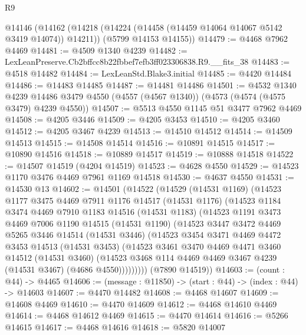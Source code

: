 \begin{lexlean}{R9}
\begin{coremodule}
  @14146
    (@14162
      (@14218 (@14224 (@14458 (@14459 @14064 @14067 @5142 @3419 @14074)) @14211))
      (@5799 @14153 @14155))
@14479 := @4468 @7962 @4469
@14481 := @4509 @1340 @4239
@14482 := LexLeanPreserve.Cb2bffcc8b22fbbef7efb3ff023306838.R9.__fits_38
@14483 := @4518 @14482
@14484 := LexLeanStd.Blake3.initial
@14485 := @4420 @14484
@14486 := @14483 @14485
@14487 := @14481 @14486
@14501 := @4532
    @1340
    @4239
    @14486
    @3479
    @4550
    (@4557 (@4567 @1340))
    (@4573 (@4574 (@4575 @3479) @4239 @4550))
@14507 := @5513 @4550 @1145 @51 @3477 @7962 @4469
@14508 := @4205 @3446
@14509 := @4205 @3453
@14510 := @4205 @3460
@14512 := @4205 @3467 @4239
@14513 := @14510 @14512
@14514 := @14509 @14513
@14515 := @14508 @14514
@14516 := @10891 @14515
@14517 := @10890 @14516
@14518 := @10889 @14517
@14519 := @10888 @14518
@14522 := @14507 @14519 (@4204 @14519)
@14523 := @4628 @4550
@14529 := @14523 @1170 @3476 @4469 @7961 @1169 @14518
@14530 := @4637 @4550
@14531 := @14530 @13
@14602 := @14501
    (@14522
      (@14529
        (@14531 @1169)
        (@14523
          @1177
          @3475
          @4469
          @7911
          @1176
          @14517
          (@14531 @1176)
          (@14523
            @1184
            @3474
            @4469
            @7910
            @1183
            @14516
            (@14531 @1183)
            (@14523
              @1191
              @3473
              @4469
              @7006
              @1190
              @14515
              (@14531 @1190)
              (@14523
                @3447
                @3472
                @4469
                @5265
                @3446
                @14514
                (@14531 @3446)
                (@14523
                  @3454
                  @3471
                  @4469
                  @4472
                  @3453
                  @14513
                  (@14531 @3453)
                  (@14523
                    @3461
                    @3470
                    @4469
                    @4471
                    @3460
                    @14512
                    (@14531 @3460)
                    (@14523 @3468 @114 @4469 @4469 @3467 @4239 (@14531 @3467) (@4686 @4550)))))))))
      (@7890 @14519))
@14603 := (count : @44) -> @4465
@14606 := (message : @11850) -> (start : @44) -> (index : @44) -> @14603
@14607 := @4470 @14482
@14608 := @4468 @14607
@14609 := @14608 @4469
@14610 := @4470 @14609
@14612 := @4468 @14610 @4469
@14614 := @4468 @14612 @4469
@14615 := @4470 @14614
@14616 := @5266 @14615
@14617 := @4468 @14616
@14618 := @5820 @14007

\end{coremodule}
\end{lexlean}
